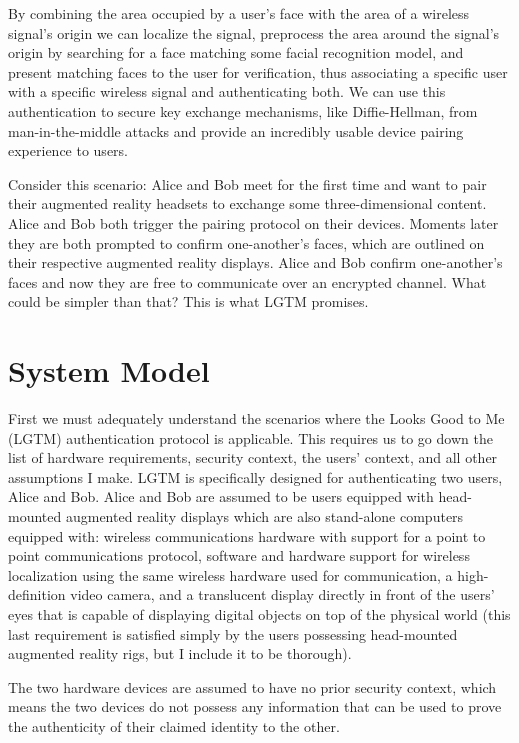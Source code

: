 \documentclass[12pt]{report}
\begin{document}
By combining the area occupied by a user's face with the area of a wireless signal's origin we can localize the signal, preprocess the area around the signal's origin by searching for a face matching some facial recognition model, and present matching faces to the user for verification, thus associating a specific user with a specific wireless signal and authenticating both. We can use this authentication to secure key exchange mechanisms, like Diffie-Hellman, from man-in-the-middle attacks and provide an incredibly usable device pairing experience to users. \par

Consider this scenario: Alice and Bob meet for the first time and want to pair their augmented reality headsets to exchange some three-dimensional content. Alice and Bob both trigger the pairing protocol on their devices. Moments later they are both prompted to confirm one-another's faces, which are outlined on their respective augmented reality displays. Alice and Bob confirm one-another's faces and now they are free to communicate over an encrypted channel. What could be simpler than that? This is what LGTM promises. \par

\section{System Model}
First we must adequately understand the scenarios where the Looks Good to Me (LGTM) authentication protocol is applicable. This requires us to go down the list of hardware requirements, security context, the users' context, and all other assumptions I make. 
LGTM is specifically designed for authenticating two users, Alice and Bob. Alice and Bob are assumed to be users equipped with head-mounted augmented reality displays which are also stand-alone computers equipped with: wireless communications hardware with support for a point to point communications protocol, software and hardware support for wireless localization using the same wireless hardware used for communication, a high-definition video camera, and a translucent display directly in front of the users' eyes that is capable of displaying digital objects on top of the physical world (this last requirement is satisfied simply by the users possessing head-mounted augmented reality rigs, but I include it to be thorough). \par

The two hardware devices are assumed to have no prior security context, which means the two devices do not possess any information that can be used to prove the authenticity of their claimed identity to the other. \par
\end{document}
